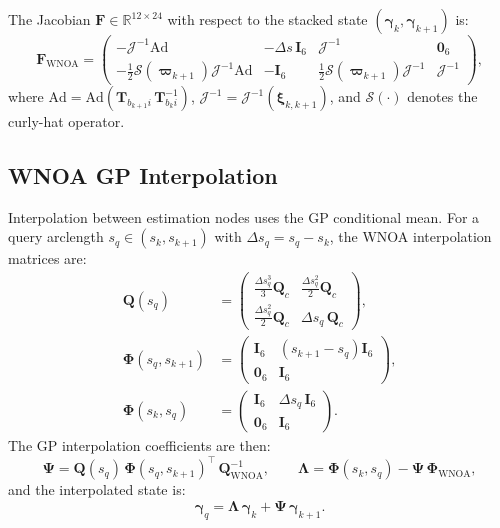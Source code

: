 \documentclass[11pt,a4paper]{article}
\newcommand{\Ad}{\mathrm{Ad}}
\newcommand{\Jac}{\mathcal{J}}
\newcommand{\curly}[1]{\mathcal{S}\!\left(#1\right)}
\newcommand{\R}{\mathbb{R}}
\newcommand{\inv}{^{-1}}
\newcommand{\T}{\mathbf{T}}
\newcommand{\bxi}{\bm{\xi}}
\newcommand{\bvarpi}{\bm{\varpi}}
\newcommand{\bgamma}{\bm{\gamma}}
\newcommand{\bPhi}{\bm{\Phi}}
\newcommand{\bF}{\mathbf{F}}
\newcommand{\bQ}{\mathbf{Q}}
\newcommand{\bI}{\mathbf{I}}
\newcommand{\bzero}{\mathbf{0}}
\begin{document}
The Jacobian $\bF \in \R^{12 \times 24}$ with respect to the stacked state $(\bgamma_k, \bgamma_{k+1})$ is:
\begin{equation}
    \bF_{\mathrm{WNOA}} = \begin{pmatrix}
        -\Jac\inv \Ad & -\Delta s\,\bI_6 & \Jac\inv & \bzero_6 \\
        -\tfrac{1}{2}\curly{\bvarpi_{k+1}}\Jac\inv \Ad & -\bI_6 & \tfrac{1}{2}\curly{\bvarpi_{k+1}}\Jac\inv & \Jac\inv
    \end{pmatrix},
    \label{eq:F-wnoa}
\end{equation}
where $\Ad = \Ad(\T_{b_{k+1}i}\,\T_{b_k i}\inv)$, $\Jac\inv = \Jac\inv(\bxi_{k,k+1})$, and $\curly{\cdot}$ denotes the curly-hat operator.

\subsection{WNOA GP Interpolation}
\label{sec:wnoa-interp}
Interpolation between estimation nodes uses the GP conditional mean.
For a query arclength $s_q \in (s_k, s_{k+1})$ with $\Delta s_q = s_q - s_k$, the WNOA interpolation matrices are:
\begin{align}
    \bQ(s_q) &= \begin{pmatrix} \frac{\Delta s_q^3}{3}\bQ_c & \frac{\Delta s_q^2}{2}\bQ_c \\ \frac{\Delta s_q^2}{2}\bQ_c & \Delta s_q\,\bQ_c \end{pmatrix}, \label{eq:Q-interp-wnoa}\\[4pt]
    \bPhi(s_q, s_{k+1}) &= \begin{pmatrix} \bI_6 & (s_{k+1}-s_q)\bI_6 \\ \bzero_6 & \bI_6 \end{pmatrix}, \label{eq:phi-partial-wnoa}\\[4pt]
    \bPhi(s_k, s_q) &= \begin{pmatrix} \bI_6 & \Delta s_q\,\bI_6 \\ \bzero_6 & \bI_6 \end{pmatrix}. \label{eq:lambda-wnoa}
\end{align}
The GP interpolation coefficients are then:
\begin{equation}
    \bm{\Psi} = \bQ(s_q)\,\bPhi(s_q, s_{k+1})^\top\,\bQ_{\mathrm{WNOA}}\inv, \qquad
    \bm{\Lambda} = \bPhi(s_k, s_q) - \bm{\Psi}\,\bPhi_{\mathrm{WNOA}},
\end{equation}
and the interpolated state is:
\begin{equation}
    \bgamma_q = \bm{\Lambda}\,\bgamma_k + \bm{\Psi}\,\bgamma_{k+1}.
    \label{eq:interp-wnoa}
\end{equation}
\end{document}
